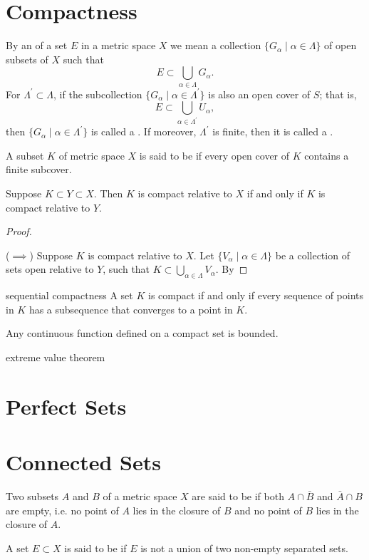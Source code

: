 \section{Compactness}
\begin{definition}
By an  of a set $E$ in a metric space $X$ we mean a collection $\{G_\alpha\mid\alpha\in\Lambda\}$ of open subsets of $X$ such that
\[ E\subset\bigcup_{\alpha\in\Lambda}G_\alpha. \]
For $\Lambda^\prime\subset\Lambda$, if the subcollection $\{G_\alpha\mid\alpha\in\Lambda^\prime\}$ is also an open cover of $S$; that is,
\[ E\subset\bigcup_{\alpha\in\Lambda^\prime}U_\alpha, \]
then $\{G_\alpha\mid\alpha\in\Lambda^\prime\}$ is called a . If moreover, $\Lambda^\prime$ is finite, then it is called a .
\end{definition}

\begin{definition}
A subset $K$ of metric space $X$ is said to be  if every open cover of $K$ contains a finite subcover.
\end{definition}

\begin{proposition}
Suppose $K\subset Y\subset X$. Then $K$ is compact relative to $X$ if and only if $K$ is compact relative to $Y$.
\end{proposition}

\begin{proof} \

($\implies$) Suppose $K$ is compact relative to $X$. Let $\{V_\alpha\mid\alpha\in\Lambda\}$ be a collection of sets open relative to $Y$, such that $K\subset\bigcup_{\alpha\in\Lambda}V_\alpha$. By 
\end{proof}

sequential compactness
A set $K$ is compact if and only if every sequence of points in $K$ has a subsequence that converges to a point in $K$.

Any continuous function defined on a compact set is bounded.

extreme value theorem

\section{Perfect Sets}


\section{Connected Sets}
\begin{definition}
Two subsets $A$ and $B$ of a metric space $X$ are said to be  if both $A\cap\bar{B}$ and $\bar{A}\cap B$ are empty, i.e. no point of $A$ lies in the closure of $B$ and no point of $B$ lies in the closure of $A$.

A set $E\subset X$ is said to be  if $E$ is not a union of two non-empty separated sets. 
\end{definition}

